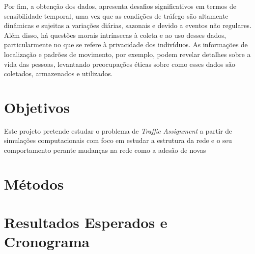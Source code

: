 \documentclass{article}
\begin{document}

Por fim, a obtenção dos dados, apresenta desafios significativos em termos de sensibilidade temporal, uma vez que as condições de tráfego são altamente dinâmicas e sujeitas a variações diárias, sazonais e devido a eventos não regulares. Além disso, há questões morais intrínsecas à coleta e ao uso desses dados, particularmente no que se refere à privacidade dos indivíduos. As informações de localização e padrões de movimento, por exemplo, podem revelar detalhes sobre a vida das pessoas, levantando preocupações éticas sobre como esses dados são coletados, armazenados e utilizados.


\newpage
\section{Objetivos}

Este projeto pretende estudar o problema de \textit{Traffic Assignment} a partir de simulações computacionais com foco em estudar a estrutura da rede e o seu comportamento perante mudanças na rede como a adesão de novas 

\newpage

\section{Métodos}

\newpage

\section{Resultados Esperados e Cronograma}

\newpage


\end{document}

